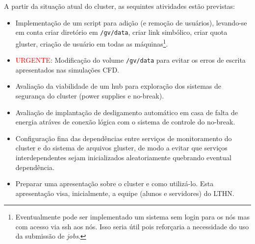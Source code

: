 A partir da situação atual do cluster, as sequintes atividades estão previstas:
\begin{itemize}
	\item[1] Implementação de um script para adição (e remoção de usuários), levando-se em conta criar diretório em \texttt{/gv/data}, criar link simbólico, criar quota gluster, criação de usuário em todas as máquinas\footnote{Eventualmente pode ser implementado um sistema sem login para os nós mas com acesso via ssh aos nós. Isso seria útil pois reforçaria a necessidade do uso da submissão de \textit{jobs}.}.
	\item[2] \textcolor{red}{URGENTE}: Modificação do volume \texttt{/gv/data} para evitar os erros de escrita apresentados nas simulações CFD.
	\item[3] Avaliação da viabilidade de um hub para exploração dos sistemas de segurança do cluster (power supplies e no-break).
	\item[4] Avaliação de implantação de desligamento automático em casa de falta de energia atráves de conexão lógica com o sistema de controle do no-break.
	\item[5] Configuração fina das dependências entre serviços de monitoramento 
	do cluster e do sistema de arquivos gluster, de modo a evitar que serviços 
	interdependentes sejam inicializados aleatoriamente quebrando eventual 
	dependência.
	\item[6] Preparar uma apresentação sobre o cluster e como utilizá-lo. Esta apresentação visa, inicialmente, a equipe (alunos e servidores) do LTHN.
\end{itemize}

